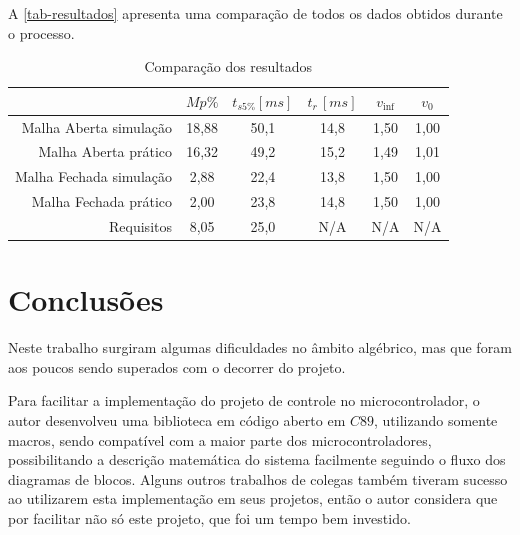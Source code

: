 \documentclass[
	12pt,				%
	article,			%
	openright,			%
	oneside,
	a4paper,			%
	chapter=TITLE,		%
	section=TITLE,		%
	english,			%
	french,				%
	spanish,			%
	brazil,				%
]{abntex2}
\begin{document}
                A \autoref{tab-resultados} apresenta uma comparação de todos os dados obtidos durante o processo.
                
                \begin{table}[]
                    \label{tab-resultados}
                    \centering
                    \caption{Comparação dos resultados}
                    \begin{tabular}{r|c|c|c|c|c}
                                    &               $Mp\%$&     $t_{s5\%}[ms]$&     $t_r\,[ms]$ &       $v_{\inf}$ &	$v_{0}$ \\ \hline
                        Malha Aberta simulação  &   18,88 &     50,1 &              14,8 &              1,50 & 			1,00 \\
                        Malha Aberta prático  &     16,32 &     49,2 &              15,2 &              1,49 & 			1,01 \\
                        Malha Fechada simulação &   2,88 &      22,4 &              13,8 &              1,50 & 			1,00 \\
                        Malha Fechada prático &     2,00 &      23,8 &              14,8 &              1,50 &			1,00 \\
                        Requisitos	        &		8,05 &		25,0 &				N/A	&				N/A	&			N/A
                    \end{tabular}
                \end{table}

    \section{Conclusões}
    
        Neste trabalho surgiram algumas dificuldades no âmbito algébrico, mas que foram aos poucos sendo superados com o decorrer do projeto.
        
        Para facilitar a implementação do projeto de controle no microcontrolador, o autor desenvolveu uma biblioteca em código aberto em $C 89$, utilizando somente macros, sendo compatível com a maior parte dos microcontroladores, possibilitando a descrição matemática do sistema facilmente seguindo o fluxo dos diagramas de blocos. Alguns outros trabalhos de colegas também tiveram sucesso ao utilizarem esta implementação em seus projetos, então o autor considera que por facilitar não só este projeto, que foi um tempo bem investido.
        
\end{document}

